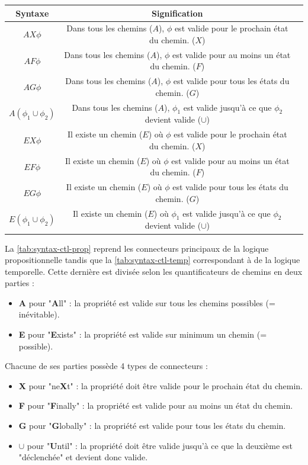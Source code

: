 \documentclass[runningheads,a4paper,10pt]{llncs}
\begin{document}
\begin{center}
\begin{tabular}{|c|c|c|}
  \hline
  Syntaxe & Signification \\
  \hline
  $AX\phi$ & Dans tous les chemins ($A$), $\phi$ est valide pour le prochain état du chemin. ($X$)\\
  $AF\phi$ & Dans tous les chemins ($A$), $\phi$ est valide pour au moins un état du chemin. ($F$) \\
  $AG\phi$ & Dans tous les chemins ($A$), $\phi$ est valide pour tous les états du chemin. ($G$) \\
  $A(\phi_{1} \cup \phi_{2})$ & Dans tous les chemins ($A$), $\phi_{1}$ est valide jusqu'à ce que $\phi_{2}$ devient valide ($\cup$) \\
  \hline
  $EX\phi$ & Il existe un chemin ($E$) où $\phi$ est valide pour le prochain état du chemin. ($X$) \\
  $EF\phi$ & Il existe un chemin ($E$) où $\phi$ est valide pour au moins un état du chemin. ($F$)\\
  $EG\phi$ & Il existe un chemin ($E$) où $\phi$ est valide pour tous les états du chemin. ($G$)\\
  $E(\phi_{1} \cup \phi_{2})$ & Il existe un chemin ($E$) où $\phi_{1}$ est valide jusqu'à ce que $\phi_{2}$ devient valide ($\cup$) \\
  
 \hline
 
\end{tabular}
 \label{tab:syntax-ctl-temp}
\end{center}

La \autoref{tab:syntax-ctl-prop} reprend les connecteurs principaux de la logique propositionnelle tandis que la \autoref{tab:syntax-ctl-temp} correspondant à de la logique temporelle. Cette dernière est divisée selon les quantificateurs de chemins en deux parties : 
\begin{itemize}
\item \textbf{A} pour "\textbf{A}ll" : la propriété est valide sur tous les chemins possibles (= inévitable).
\item \textbf{E} pour "\textbf{E}xists" : la propriété est valide sur minimum un chemin (= possible).
\end{itemize}

Chacune de ses parties possède 4 types de connecteurs : 
\begin{itemize}
\item \textbf{X} pour "ne\textbf{X}t" : la propriété doit être valide pour le prochain état du chemin. 
\item \textbf{F} pour "\textbf{F}inally" : la propriété est valide pour au moins un état du chemin.
\item \textbf{G} pour "\textbf{G}lobally" : la propriété est valide pour tous les états du chemin.
\item $\pmb{\cup}$ pour "\textbf{U}ntil" : la propriété doit être valide jusqu'à ce que la deuxième est "déclenchée" et devient donc valide. \\
\end{itemize}
\end{document}
